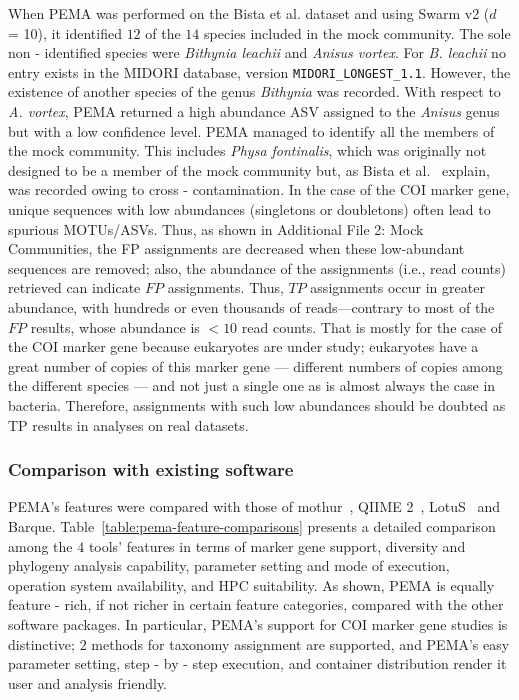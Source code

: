       When PEMA was performed on the Bista et al. dataset \citep{bista2018performance} and using Swarm v2 ($d$ = 10), it identified $12$ of the $14$ species included in the mock community. 
      The sole non - identified species were \textit{Bithynia leachii} and \textit{Anisus vortex}. For \textit{B. leachii} no entry exists in the MIDORI database, version \texttt{MIDORI\_LONGEST\_1.1}. 
      However, the existence of another species of the genus \textit{Bithynia} was recorded. 
      With respect to \textit{A. vortex}, PEMA returned a high abundance ASV assigned to the \textit{Anisus} genus but with a low confidence level. 
      PEMA managed to identify all the members of the mock community. 
      This includes \textit{Physa fontinalis}, which was originally not designed to be a member of the mock community but, as Bista et al.~\citep{bista2018performance} explain, was recorded owing to cross - contamination. 
      In the case of the COI marker gene, unique sequences with low abundances (singletons or doubletons) often lead to spurious MOTUs/ASVs. 
      Thus, as shown in Additional File 2: Mock Communities, the FP assignments are decreased when these low-abundant sequences are removed; 
      also, the abundance of the assignments (i.e., read counts) retrieved can indicate $FP$ assignments. 
      Thus, $TP$ assignments occur in greater abundance, with hundreds or even thousands of reads—contrary to most of the $FP$ results, whose abundance is $<10$ read counts. 
      That is mostly for the case of the COI marker gene because eukaryotes are under study; 
      eukaryotes have a great number of copies of this marker gene — different numbers of copies among the different species — and not just a single one as is almost always the case in bacteria. 
      Therefore, assignments with such low abundances should be doubted as TP results in analyses on real datasets.



   \subsubsection*{Comparison with existing software}

      PEMA's features were compared with those of mothur~\citep{schloss2009introducing}, QIIME 2~\citep{bolyen2018qiime}, LotuS~\citep{hildebrand2014lotus} and Barque. 
      Table~\ref{table:pema-feature-comparisons} presents a detailed comparison among the $4$ tools' features in terms of marker gene support, diversity and phylogeny analysis capability, parameter setting and mode of execution, operation system availability, and HPC suitability. 
      As shown, PEMA is equally feature - rich, if not richer in certain feature categories, compared with the other software packages. In particular, PEMA's support for COI marker gene studies is distinctive; 
      $2$ methods for taxonomy assignment are supported, and PEMA's easy parameter setting, step - by - step execution, and container distribution render it user and analysis friendly.

